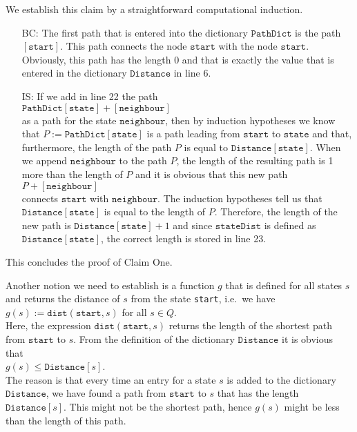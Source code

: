 \noindent
We establish this claim by a straightforward computational induction.  
\begin{enumerate}
\item[BC:] The first path that is entered into the dictionary $\texttt{PathDict}$ is the path
           $[\texttt{start}]$.  This path connects the node $\texttt{start}$ with the node $\texttt{start}$.
           Obviously, this path has the length $0$ and that is exactly the value that is entered in the
           dictionary $\texttt{Distance}$ in line 6.
\item[IS:] If we add in line 22 the path
           \\[0.2cm]
           \hspace*{1.3cm}
           $\texttt{PathDict}[\texttt{state}] + [\texttt{neighbour}]$
           \\[0.2cm]
           as a path for the state $\texttt{neighbour}$, then by induction hypotheses we know that
           $P:=\texttt{PathDict}[\texttt{state}]$ is a path leading from $\texttt{start}$ to $\texttt{state}$ and
           that, furthermore, the length of the path $P$ is equal to $\texttt{Distance}[\texttt{state}]$.  When
           we append $\texttt{neighbour}$ to the path $P$, the length of the resulting path is 1 more than the
           length of $P$ and it is obvious that this new path 
           \\[0.2cm]
           \hspace*{1.3cm}
           $P + [\texttt{neighbour}]$
           \\[0.2cm]
           connects $\texttt{start}$ with $\texttt{neighbour}$.  The induction hypotheses tell us that
           $\texttt{Distance}[\texttt{state}]$ is equal to the length of $P$.  Therefore, the length of the new
           path is $\texttt{Distance}[\texttt{state}] + 1$ and since $\texttt{stateDist}$ is defined as
           $\texttt{Distance}[\texttt{state}]$, the correct length is stored in line 23.
\end{enumerate}
This concludes the proof of Claim One. \green{$\surd$}
\vspace*{0.2cm}

Another notion we need to establish is a function $g$ that is defined for all states $s$ and returns the
distance of $s$ from the state \texttt{start}, i.e.~we have
\\[0.2cm]
\hspace*{1.3cm}
$g(s) := \texttt{dist}(\texttt{start}, s)$ \quad for all $s \in Q$.
\\[0.2cm]
Here, the expression $\texttt{dist}(\texttt{start}, s)$ returns the length of the shortest path from
$\texttt{start}$ to $s$.  From the definition of the dictionary $\texttt{Distance}$ it is obvious that
\\[0.2cm]
\hspace*{1.3cm}
$g(s) \leq \texttt{Distance}[s]$.
\\[0.2cm]
The reason is that every time an entry for a state $s$ is added to the dictionary $\texttt{Distance}$, we have
found a path from $\texttt{start}$ to $s$ that has the length $\texttt{Distance}[s]$.  This might not be the
shortest path, hence $g(s)$ might be less than the length of this path.


